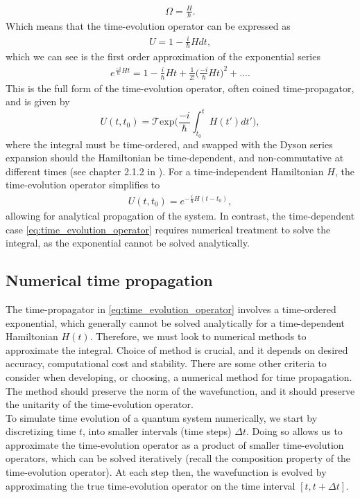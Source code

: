 \documentclass{subfiles}
\begin{document}
\begin{align*}
    \Omega = \frac{H}{\hbar}.
\end{align*}
Which means that the time-evolution operator can be expressed as 
\begin{align*}
    U = 1 - \frac{i}{\hbar}Hdt,
\end{align*}
which we can see is the first order approximation of the exponential series
\begin{align*}
    e^{\frac{-i}{\hbar}Ht} = 1 - \frac{i}{\hbar}Ht + \frac{1}{2!}\bigg(\frac{-i}{\hbar}Ht\bigg)^2 + ... .
\end{align*}
This is the full form of the time-evolution operator, often coined time-propagator, and is given by
\begin{equation}
    U(t, t_0) = \mathcal{T}\text{exp}\bigg(\frac{-i}{\hbar}\int_{t_0}^t H(t')dt'\bigg)\label{eq:time_evolution_operator},
\end{equation}
where the integral must be time-ordered, and swapped with the Dyson series expansion should the Hamiltonian be time-dependent, and non-commutative at different times (see chapter 2.1.2 in \cite{sakurai1986modern}). For a time-independent Hamiltonian $H$, the time-evolution operator simplifies to 
\begin{align*}
    U(t, t_0) = e^{-\frac{i}{\hbar}H(t-t_0)},
\end{align*}
allowing for analytical propagation of the system. In contrast, the time-dependent case \eqref{eq:time_evolution_operator} requires numerical treatment to solve the integral, as the exponential cannot be solved analytically. 

\subsection{Numerical time propagation}
The time-propagator in \eqref{eq:time_evolution_operator} involves a time-ordered exponential, which generally cannot be solved analytically for a time-dependent Hamiltonian $H(t)$. Therefore, we must look to numerical methods to approximate the integral. Choice of method is crucial, and it depends on desired accuracy, computational cost and stability. There are some other criteria to consider when developing, or choosing, a numerical method for time propagation. The method should preserve the norm of the wavefunction, and it should preserve the unitarity of the time-evolution operator. 
\\

To simulate time evolution of a quantum system numerically, we start by discretizing time $t$, into smaller intervals (time steps) $\Delta t$. Doing so allows us to approximate the time-evolution operator as a product of smaller time-evolution operators, which can be solved iteratively (recall the composition property of the time-evolution operator). At each step then, the wavefunction is evolved by approximating the true time-evolution operator on the time interval $[t, t+\Delta t]$. \\ 
\end{document}
